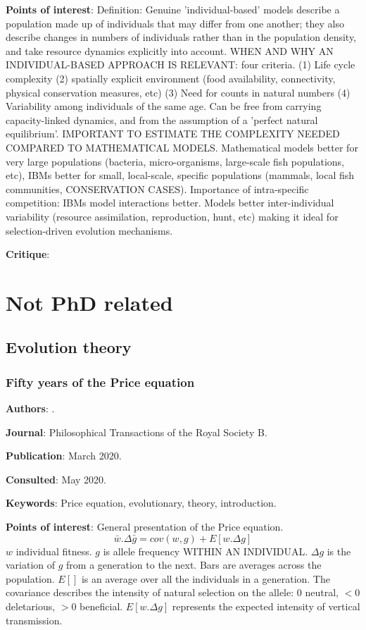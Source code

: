 \documentclass[12pt,a4paper]{article}
\begin{document}
\textbf{Points of interest}: Definition: Genuine 'individual-based' models describe a population made up of individuals that may differ from one another; they also describe changes in numbers of individuals rather than in the population density, and take resource dynamics explicitly into account. WHEN AND WHY AN INDIVIDUAL-BASED APPROACH IS RELEVANT: four criteria. (1) Life cycle complexity (2) spatially explicit environment (food availability, connectivity, physical conservation measures, etc) (3) Need for counts in natural numbers (4) Variability among individuals of the same age. Can be free from carrying capacity-linked dynamics, and from the assumption of a 'perfect natural equilibrium'. IMPORTANT TO ESTIMATE THE COMPLEXITY NEEDED COMPARED TO MATHEMATICAL MODELS. Mathematical models better for very large populations (bacteria, micro-organisms, large-scale fish populations, etc), IBMs better for small, local-scale, specific populations (mammals, local fish communities, CONSERVATION CASES). Importance of intra-specific competition: IBMs model interactions better. Models better inter-individual variability (resource assimilation, reproduction, hunt, etc) making it ideal for selection-driven evolution mechanisms.

\textbf{Critique}:

\newpage

\section*{Not PhD related}

\subsection*{Evolution theory}

\subsubsection*{Fifty years of the Price equation}

\textbf{Authors}: \cite{lethtonen2020price}.

\textbf{Journal}: Philosophical Transactions of the Royal Society B.

\textbf{Publication}: March 2020.

\textbf{Consulted}: May 2020.

\textbf{Keywords}: Price equation, evolutionary, theory, introduction.

\textbf{Points of interest}: General presentation of the Price equation.
\begin{equation}
\bar{w}.\Delta\bar{g} = cov(w,g) + E[w.\Delta g]
\end{equation}
$w$ individual fitness. $g$ is allele frequency WITHIN AN INDIVIDUAL. $\Delta{g}$ is the variation of $g$ from a generation to the next. Bars are averages across the population. $E[]$ is an average over all the individuals in a generation.
The covariance describes the intensity of natural selection on the allele: 0 neutral, $<0$ deletarious, $>0$ beneficial.
$E[w.\Delta g]$ represents the expected intensity of vertical transmission.
\end{document}
